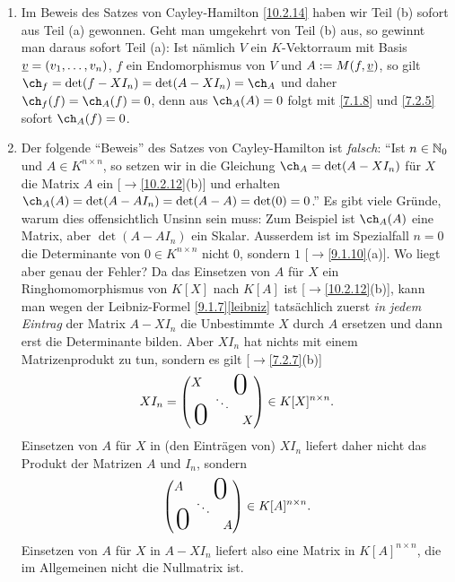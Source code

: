 \documentclass[../../main.tex]{subfiles}
\begin{document}
\begin{bem} \label{10.2.15}
\begin{enumerate}[\normalfont(a)]
\item Im Beweis des Satzes von Cayley-Hamilton \ref{10.2.14} haben wir Teil (b) sofort aus Teil (a) gewonnen. Geht man umgekehrt von Teil (b) aus, so gewinnt man daraus sofort Teil (a):
Ist nämlich $V$ ein $K$-Vektorraum mit Basis ${\underline v}=(v_1,\dots,v_n)$, $f$ ein Endomorphismus von $V$ und $A:=M(f,{\underline v})$, so gilt $\ch_f=\det(f-XI_n)=\det(A-XI_n)=\ch_A$ und
daher $\ch_f(f)=\ch_A(f)=0$, denn aus $\ch_A(A)=0$ folgt mit \ref{7.1.8} und \ref{7.2.5} sofort $\ch_A(f)=0$.
\item Der folgende "`Beweis"' des Satzes von Cayley-Hamilton ist \emph{falsch}: "`Ist $n\in\mathbb N_0$ und $A\in K^{n\times n}$, so setzen wir in die Gleichung $\ch_A=\det(A-XI_n)$
für $X$ die Matrix $A$ ein [$\to$\ref{10.2.12}(b)] und erhalten $\ch_A(A)=\det(A-AI_n)=\det(A-A)=\det(0)=0$."' Es gibt viele Gründe, warum dies offensichtlich Unsinn sein muss: Zum Beispiel ist $\ch_A(A)$ eine Matrix, aber $\det(A-AI_n)$ ein Skalar. Ausserdem ist im Spezialfall $n=0$ die Determinante von $0\in K^{n\times n}$ nicht $0$, sondern $1$ [$\to$\ref{9.1.10}(a)]. Wo liegt aber genau der Fehler? Da das Einsetzen von $A$ für $X$ ein
Ringhomomorphismus von $K[X]$ nach $K[A]$ ist [$\to$\ref{10.2.12}(b)], kann man wegen der Leibniz-Formel \ref{9.1.7}\eqref{leibniz} tatsächlich zuerst \emph{in jedem Eintrag} der
Matrix $A-XI_n$ die Unbestimmte $X$ durch $A$ ersetzen und dann erst die Determinante bilden. Aber $XI_n$ hat nichts mit einem Matrizenprodukt zu tun, sondern es gilt
[$\to$\ref{7.2.7}(b)]
\[XI_n=\begin{pmatrix}
      X& \multicolumn{2}{c}{\text{\kern 1em\smash{\raisebox{-1.5ex}{\Huge 0}}}} \\
      & \ddots &  \\
      \multicolumn{2}{c}{\text{\kern-1.5em\smash{\raisebox{0ex}{\Huge 0}}}} &X
    \end{pmatrix}\in K[X]^{n\times n}.\] Einsetzen von $A$ für $X$ in (den Einträgen von) $XI_n$ liefert daher nicht das Produkt der Matrizen $A$ und $I_n$, sondern 
    \[\begin{pmatrix}
      A& \multicolumn{2}{c}{\text{\kern 1em\smash{\raisebox{-1.5ex}{\Huge 0}}}} \\
      & \ddots &  \\
      \multicolumn{2}{c}{\text{\kern-1.5em\smash{\raisebox{0ex}{\Huge 0}}}} &A
    \end{pmatrix}\in K[A]^{n\times n}.\] Einsetzen von $A$ für $X$ in $A-XI_n$ liefert also eine Matrix in $K[A]^{n\times n}$, die im Allgemeinen nicht die Nullmatrix ist.


\end{enumerate}
\end{bem}
\end{document}
